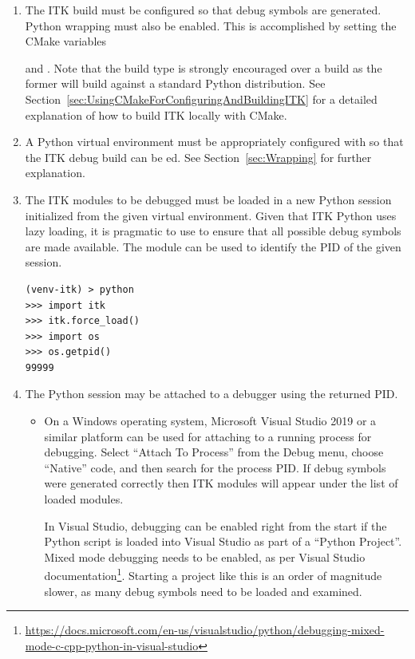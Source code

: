 \begin{enumerate}

\item The ITK build must be configured so that debug symbols
are generated. Python wrapping must also be enabled.
This is accomplished by setting the CMake variables

 and .
Note that the  build type is strongly encouraged over a 
build as the former will build against a standard Python distribution.
See Section~\ref{sec:UsingCMakeForConfiguringAndBuildingITK} for a detailed
explanation of how to build ITK locally with CMake.

\item A Python virtual environment must be appropriately configured with
 so that the ITK debug build can be ed.
See Section~\ref{sec:Wrapping} for further explanation.

\item The ITK modules to be debugged must be loaded in a new Python session initialized
from the given virtual environment. Given that ITK Python uses lazy loading, it is
pragmatic to use  to ensure that all possible debug symbols
are made available. The  module can be used to identify the PID of the given session.

\begin{verbatim}
(venv-itk) > python
>>> import itk
>>> itk.force_load()
>>> import os
>>> os.getpid()
99999
\end{verbatim}

\item The Python session may be attached to a debugger using the returned PID.

\begin{itemize}

\item On a Windows operating system, Microsoft Visual Studio 2019 or a similar platform
can be used for attaching to a running process for debugging. Select \enquote{Attach To Process}
from the Debug menu, choose \enquote{Native} code, and then search for the process PID. If
debug symbols were generated correctly then ITK modules will appear under the list of
loaded modules.

In Visual Studio, debugging can be enabled right from the start if the Python script
is loaded into Visual Studio as part of a \enquote{Python Project}.
Mixed mode debugging needs to be enabled, as per Visual Studio
documentation\footnote{
\url{https://docs.microsoft.com/en-us/visualstudio/python/debugging-mixed-mode-c-cpp-python-in-visual-studio}}.
Starting a project like this is an order of magnitude slower, as many debug symbols need to be loaded and examined.


\end{itemize}
\end{enumerate}
